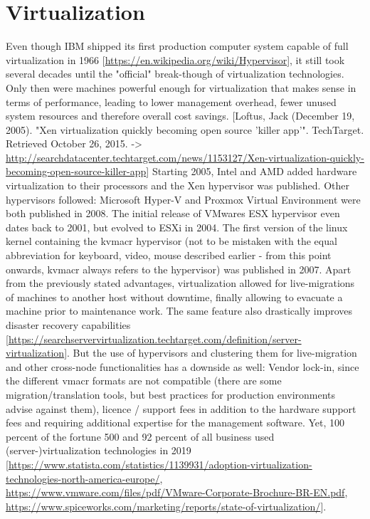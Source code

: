 \section{Virtualization}
Even though IBM shipped its first production computer system capable of full virtualization in 1966 [\url{https://en.wikipedia.org/wiki/Hypervisor}], it still took several decades until the "official" break-though of virtualization technologies. Only then were machines powerful enough for virtualization that makes sense in terms of performance, leading to lower management overhead, fewer unused system resources and therefore overall cost savings. [Loftus, Jack (December 19, 2005). "Xen virtualization quickly becoming open source 'killer app'". TechTarget. Retrieved October 26, 2015. -> \url{http://searchdatacenter.techtarget.com/news/1153127/Xen-virtualization-quickly-becoming-open-source-killer-app}]
Starting 2005, Intel and AMD added hardware virtualization to their processors and the Xen hypervisor was published. Other hypervisors followed: Microsoft Hyper-V and Proxmox Virtual Environment were both published in 2008. The initial release of VMwares ESX hypervisor even dates back to 2001, but evolved to ESXi in 2004. The first version of the linux kernel containing the \gls{kvmacr} hypervisor (not to be mistaken with the equal abbreviation for keyboard, video, mouse described earlier - from this point onwards, \gls{kvmacr} always refers to the hypervisor) was published in 2007.
\newline
Apart from the previously stated advantages, virtualization allowed for live-migrations of machines to another host without downtime, finally allowing to evacuate a machine prior to maintenance work. The same feature also drastically improves disaster recovery capabilities [\url{https://searchservervirtualization.techtarget.com/definition/server-virtualization}].
\newline
But the use of hypervisors and clustering them for live-migration and other cross-node functionalities has a downside as well: Vendor lock-in, since the different \gls{vmacr} formats are not compatible (there are some migration/translation tools, but best practices for production environments advise against them), licence / support fees in addition to the hardware support fees and requiring additional expertise for the management software.
\newline
Yet, 100 percent of the fortune 500 and 92 percent of all business used (server-)virtualization technologies in 2019 [\url{https://www.statista.com/statistics/1139931/adoption-virtualization-technologies-north-america-europe/}, \url{https://www.vmware.com/files/pdf/VMware-Corporate-Brochure-BR-EN.pdf}, \url{https://www.spiceworks.com/marketing/reports/state-of-virtualization/}].


